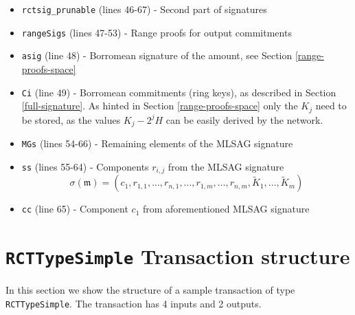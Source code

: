 \begin{appendices}
\begin{itemize}
    \item {\tt rctsig\_prunable} (lines 46-67) - Second part of signatures
    \item {\tt rangeSigs} (lines 47-53) - Range proofs for output commitments
    \item {\tt asig} (line 48) - Borromean signature of the amount, see Section \ref{range-proofs-space} 
    \item {\tt Ci} (line 49) -  Borromean commitments (ring keys), as described in Section \ref{full-signature}. As
    hinted in Section \ref{range-proofs-space} only the \(K_j\) need to be stored, as the values \(K_j - 2^j H\)
    can be easily derived by the network.
    \item {\tt MGs} (lines 54-66) - Remaining elements of the MLSAG signature
    \item {\tt ss} (lines 55-64) - Components \(r_{i,j}\) from the MLSAG signature
      \[\sigma(\mathfrak{m}) = (c_1, r_{1, 1}, ..., r_{n, 1}, ..., r_{1, m}, ..., r_{n, m}, \tilde{K}_1, ...,  \tilde{K}_m) \]
    \item {\tt cc} (line 65) - Component \(c_1\) from aforementioned MLSAG signature
	
\end{itemize}



\chapter{{\tt RCTTypeSimple} Transaction structure}
\label{appendix:RCTTypeSimple}


In this section we show the structure of a sample transaction of type {\tt RCTTypeSimple}.
The transaction has 4 inputs and 2 outputs.




\end{appendices}

